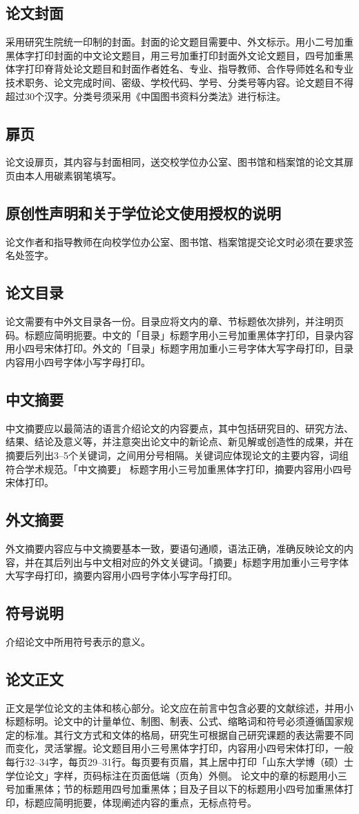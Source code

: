 \documentclass{sduthesis}
\begin{document}
\subsection{论文封面}
采用研究生院统一印制的封面。封面的论文题目需要中、外文标示。用小二号加重黑体字打印封面的中文论文题目，用三号加重打印封面外文论文题目，四号加重黑体字打印脊背处论文题目和封面作者姓名、专业、指导教师、合作导师姓名和专业技术职务、论文完成时间、密级、学校代码、学号、分类号等内容。论文题目不得超过30个汉字。分类号须采用《中国图书资料分类法》进行标注。
\subsection{扉页}
论文设扉页，其内容与封面相同，送交校学位办公室、图书馆和档案馆的论文其扉页由本人用碳素钢笔填写。
\subsection{原创性声明和关于学位论文使用授权的说明}
论文作者和指导教师在向校学位办公室、图书馆、档案馆提交论文时必须在要求签名处签字。
\subsection{论文目录}
论文需要有中外文目录各一份。目录应将文内的章、节标题依次排列，并注明页码。标题应简明扼要。中文的「目录」标题字用小三号加重黑体字打印，目录内容用小四号宋体打印。外文的「目录」标题字用加重小三号字体大写字母打印，目录内容用小四号字体小写字母打印。
\subsection{中文摘要}
中文摘要应以最简洁的语言介绍论文的内容要点，其中包括研究目的、研究方法、结果、结论及意义等，并注意突出论文中的新论点、新见解或创造性的成果，并在摘要后列出3--5个关键词，之间用分号相隔。关键词应体现论文的主要内容，词组符合学术规范。「中文摘要」 标题字用小三号加重黑体字打印，摘要内容用小四号宋体打印。
\subsection{外文摘要}
外文摘要内容应与中文摘要基本一致，要语句通顺，语法正确，准确反映论文的内容，并在其后列出与中文相对应的外文关键词。「摘要」标题字用加重小三号字体大写字母打印，摘要内容用小四号字体小写字母打印。
\subsection{符号说明}
介绍论文中所用符号表示的意义。
\subsection{论文正文}
正文是学位论文的主体和核心部分。论文应在前言中包含必要的文献综述，并用小标题标明。论文中的计量单位、制图、制表、公式、缩略词和符号必须遵循国家规定的标准。其行文方式和文体的格局，研究生可根据自己研究课题的表达需要不同而变化，灵活掌握。论文题目用小三号黑体字打印，内容用小四号宋体打印，一般每行32--34字，每页29--31行。每页要有页眉，其上居中打印「山东大学博（硕）士学位论文」字样，页码标注在页面低端（页角）外侧。 论文中的章的标题用小三号加重黑体；节的标题用四号加重黑体；目及子目以下的标题用小四号加重黑体打印，标题应简明扼要，体现阐述内容的重点，无标点符号。
\end{document}
